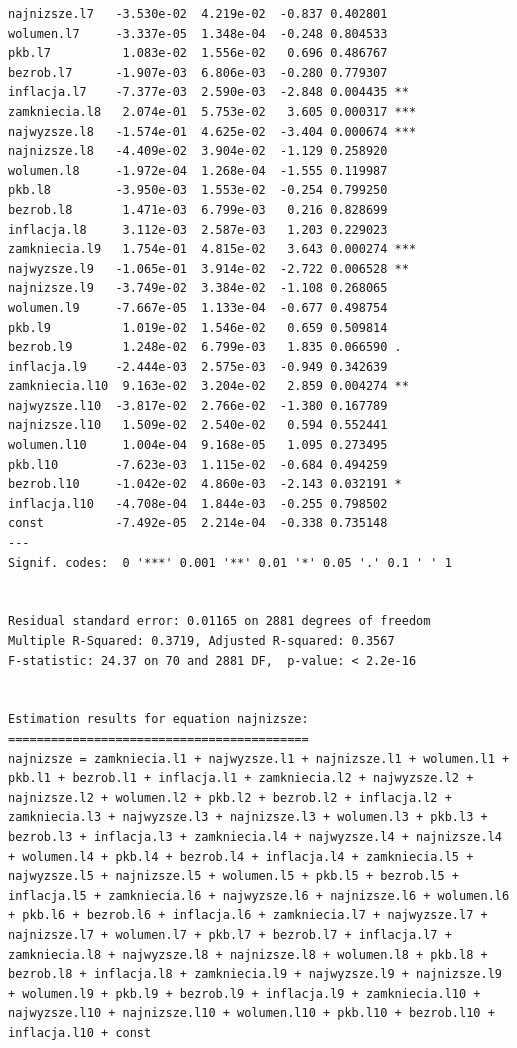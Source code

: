 \documentclass[
  polish,
  letterpaper,
  DIV=11,
  numbers=noendperiod]{scrartcl}
\begin{document}
\begin{verbatim}
najnizsze.l7   -3.530e-02  4.219e-02  -0.837 0.402801    
wolumen.l7     -3.337e-05  1.348e-04  -0.248 0.804533    
pkb.l7          1.083e-02  1.556e-02   0.696 0.486767    
bezrob.l7      -1.907e-03  6.806e-03  -0.280 0.779307    
inflacja.l7    -7.377e-03  2.590e-03  -2.848 0.004435 ** 
zamkniecia.l8   2.074e-01  5.753e-02   3.605 0.000317 ***
najwyzsze.l8   -1.574e-01  4.625e-02  -3.404 0.000674 ***
najnizsze.l8   -4.409e-02  3.904e-02  -1.129 0.258920    
wolumen.l8     -1.972e-04  1.268e-04  -1.555 0.119987    
pkb.l8         -3.950e-03  1.553e-02  -0.254 0.799250    
bezrob.l8       1.471e-03  6.799e-03   0.216 0.828699    
inflacja.l8     3.112e-03  2.587e-03   1.203 0.229023    
zamkniecia.l9   1.754e-01  4.815e-02   3.643 0.000274 ***
najwyzsze.l9   -1.065e-01  3.914e-02  -2.722 0.006528 ** 
najnizsze.l9   -3.749e-02  3.384e-02  -1.108 0.268065    
wolumen.l9     -7.667e-05  1.133e-04  -0.677 0.498754    
pkb.l9          1.019e-02  1.546e-02   0.659 0.509814    
bezrob.l9       1.248e-02  6.799e-03   1.835 0.066590 .  
inflacja.l9    -2.444e-03  2.575e-03  -0.949 0.342639    
zamkniecia.l10  9.163e-02  3.204e-02   2.859 0.004274 ** 
najwyzsze.l10  -3.817e-02  2.766e-02  -1.380 0.167789    
najnizsze.l10   1.509e-02  2.540e-02   0.594 0.552441    
wolumen.l10     1.004e-04  9.168e-05   1.095 0.273495    
pkb.l10        -7.623e-03  1.115e-02  -0.684 0.494259    
bezrob.l10     -1.042e-02  4.860e-03  -2.143 0.032191 *  
inflacja.l10   -4.708e-04  1.844e-03  -0.255 0.798502    
const          -7.492e-05  2.214e-04  -0.338 0.735148    
---
Signif. codes:  0 '***' 0.001 '**' 0.01 '*' 0.05 '.' 0.1 ' ' 1


Residual standard error: 0.01165 on 2881 degrees of freedom
Multiple R-Squared: 0.3719, Adjusted R-squared: 0.3567 
F-statistic: 24.37 on 70 and 2881 DF,  p-value: < 2.2e-16 


Estimation results for equation najnizsze: 
========================================== 
najnizsze = zamkniecia.l1 + najwyzsze.l1 + najnizsze.l1 + wolumen.l1 + pkb.l1 + bezrob.l1 + inflacja.l1 + zamkniecia.l2 + najwyzsze.l2 + najnizsze.l2 + wolumen.l2 + pkb.l2 + bezrob.l2 + inflacja.l2 + zamkniecia.l3 + najwyzsze.l3 + najnizsze.l3 + wolumen.l3 + pkb.l3 + bezrob.l3 + inflacja.l3 + zamkniecia.l4 + najwyzsze.l4 + najnizsze.l4 + wolumen.l4 + pkb.l4 + bezrob.l4 + inflacja.l4 + zamkniecia.l5 + najwyzsze.l5 + najnizsze.l5 + wolumen.l5 + pkb.l5 + bezrob.l5 + inflacja.l5 + zamkniecia.l6 + najwyzsze.l6 + najnizsze.l6 + wolumen.l6 + pkb.l6 + bezrob.l6 + inflacja.l6 + zamkniecia.l7 + najwyzsze.l7 + najnizsze.l7 + wolumen.l7 + pkb.l7 + bezrob.l7 + inflacja.l7 + zamkniecia.l8 + najwyzsze.l8 + najnizsze.l8 + wolumen.l8 + pkb.l8 + bezrob.l8 + inflacja.l8 + zamkniecia.l9 + najwyzsze.l9 + najnizsze.l9 + wolumen.l9 + pkb.l9 + bezrob.l9 + inflacja.l9 + zamkniecia.l10 + najwyzsze.l10 + najnizsze.l10 + wolumen.l10 + pkb.l10 + bezrob.l10 + inflacja.l10 + const 


\end{verbatim}
\end{document}
